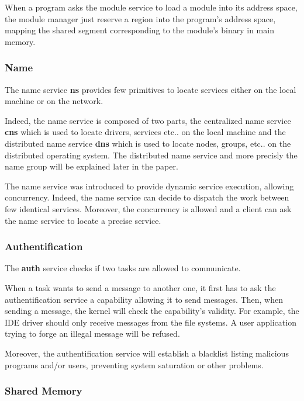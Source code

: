 \begin{multicols}{2}
When a program asks the module service to load a module into its address
space, the module manager just reserve a region into the program's address
space, mapping the shared segment corresponding to the module's binary in
main memory.

\subsubsection{Name}

The name service \textbf{ns} provides few primitives to locate services
either on the local machine or on the network.

Indeed, the name service is composed of two parts, the centralized name
service \textbf{cns} which is used to locate drivers, services etc.. on
the local machine and the distributed name service \textbf{dns} which is
used to locate nodes, groups, etc.. on the distributed operating system.
The distributed name service and more precisly the name group will be
explained later in the paper.

The name service was introduced to provide dynamic service execution, allowing
concurrency. Indeed, the name service can decide to dispatch the work between
few identical services. Moreover, the concurrency is allowed and a client
can ask the name service to locate a precise service.

\subsubsection{Authentification}

The \textbf{auth} service checks if two tasks are allowed to communicate.

When a task wants to send a message to another one, it first has to ask
the authentification service a capability allowing it to send messages. Then,
when sending a message, the kernel will check the capability's validity.
For example, the IDE driver should only receive messages from the file systems.
A user application trying to forge an illegal message will be refused.

Moreover, the authentification service will establish a blacklist listing
malicious programs and/or users, preventing system saturation or other
problems.

\subsubsection{Shared Memory}


\end{multicols}
